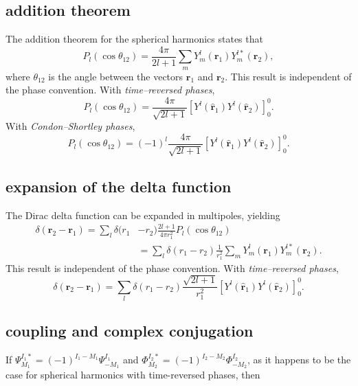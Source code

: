 \begin{subappendices}
\subsection{addition theorem}
The addition theorem for the spherical harmonics states that
\begin{equation}\label{eq129}
P_l(\cos \theta_{12})=\frac{4\pi}{2l+1}\sum_m Y_m^l(\mathbf{r}_1)Y_m^{l*}(\mathbf{r}_2),
\end{equation}
where $\theta_{12}$ is the angle between the vectors $\mathbf{r}_1$ and $\mathbf{r}_2$. This result is independent of the phase convention. With \emph{time--reversed phases},
\begin{equation}\label{eq130}
P_l(\cos \theta_{12})=\frac{4\pi}{\sqrt{2l+1}}\left[ Y^{l}(\hat {\mathbf{r}}_1)Y^{l}(\hat {\mathbf{r}}_2) \right]^{0}_{0}.
\end{equation}
With \emph{Condon--Shortley phases},
\begin{equation}\label{eq131}
P_l(\cos \theta_{12})=(-1)^l\frac{4\pi}{\sqrt{2l+1}}\left[ Y^{l}(\hat {\mathbf{r}}_1)Y^{l}(\hat {\mathbf{r}}_2) \right]^{0}_{0}.
\end{equation}
\subsection{expansion of the delta function}
The Dirac delta function can be expanded in multipoles, yielding
\begin{equation}\label{eq132}
\begin{split}
\delta(\mathbf{r}_2-\mathbf{r}_1)=\sum_l \delta(r_1&-r_2)\frac{2l+1}{4\pi r_{1}^2}P_l(\cos \theta_{12})\\
&=\sum_l \delta(r_1-r_2)\frac{1}{r_{1}^2}\sum_m Y_m^l(\mathbf{r}_1)Y_m^{l*}(\mathbf{r}_2).
\end{split}
\end{equation}
This result is independent of the phase convention. With \emph{time--reversed phases},
\begin{equation}\label{eq133}
\delta(\mathbf{r}_2-\mathbf{r}_1)=\sum_l \delta(r_1-r_2)\frac{\sqrt{2l+1}}{r_{1}^2}\left[ Y^{l}(\hat {\mathbf{r}}_1)Y^{l}(\hat {\mathbf{r}}_2) \right]^{0}_{0}.
\end{equation}
\subsection{coupling and complex conjugation}
If $\Psi^{I_1*}_{M_1}=(-1)^{I_1-M_1}\Psi^{I_1}_{-M_1}$ and $\Phi^{I_2*}_{M_2}=(-1)^{I_2-M_2}\Phi^{I_2}_{-M_2}$, as it happens to be the case for spherical harmonics with time-reversed phases, then


\end{subappendices}
